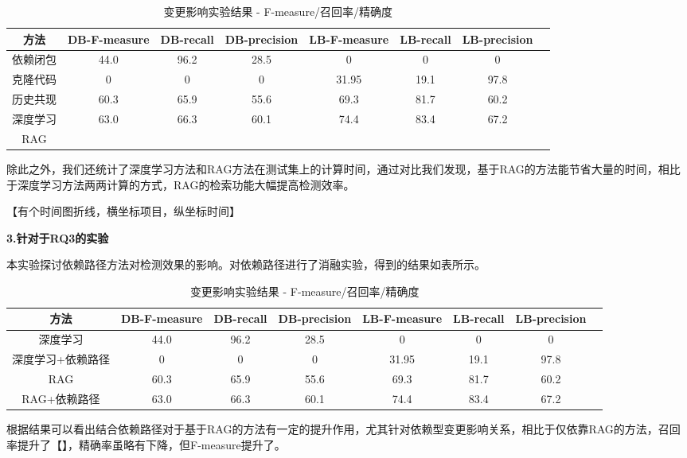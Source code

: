 \begin{table}[htbp]
\caption{变更影响实验结果 - F-measure/召回率/精确度}
\vspace{0.5em}\centering\wuhao
\begin{tabular}{cccccccc}
\toprule
方法 & DB-F-measure & DB-recall & DB-precision & LB-F-measure & LB-recall & LB-precision  \\
\midrule
依赖闭包 & 44.0 & 96.2 & 28.5 & 0 & 0 & 0 \\
克隆代码 & 0 & 0 &  0 & 31.95 & 19.1 & 97.8 \\
历史共现 & 60.3 & 65.9 & 55.6 & 69.3 & 81.7 & 60.2 \\
深度学习 & 63.0 & 66.3 & 60.1 & 74.4 & 83.4 & 67.2 \\
RAG &  &  &  &  &  &  \\
\bottomrule
\end{tabular}
\end{table}

除此之外，我们还统计了深度学习方法和RAG方法在测试集上的计算时间，通过对比我们发现，基于RAG的方法能节省大量的时间，相比于深度学习方法两两计算的方式，RAG的检索功能大幅提高检测效率。

【有个时间图折线，横坐标项目，纵坐标时间】

\textbf{3.针对于RQ3的实验}

本实验探讨依赖路径方法对检测效果的影响。对依赖路径进行了消融实验，得到的结果如表所示。

\begin{table}[htbp]
\caption{变更影响实验结果 - F-measure/召回率/精确度}
\vspace{0.5em}\centering\wuhao
\begin{tabular}{cccccccc}
\toprule
方法 & DB-F-measure & DB-recall & DB-precision & LB-F-measure & LB-recall & LB-precision  \\
\midrule
深度学习 & 44.0 & 96.2 & 28.5 & 0 & 0 & 0 \\
深度学习+依赖路径 & 0 & 0 &  0 & 31.95 & 19.1 & 97.8 \\
RAG & 60.3 & 65.9 & 55.6 & 69.3 & 81.7 & 60.2 \\
RAG+依赖路径 & 63.0 & 66.3 & 60.1 & 74.4 & 83.4 & 67.2 \\
\bottomrule
\end{tabular}
\end{table}

根据结果可以看出结合依赖路径对于基于RAG的方法有一定的提升作用，尤其针对依赖型变更影响关系，相比于仅依靠RAG的方法，召回率提升了【】，精确率虽略有下降，但F-measure提升了。

